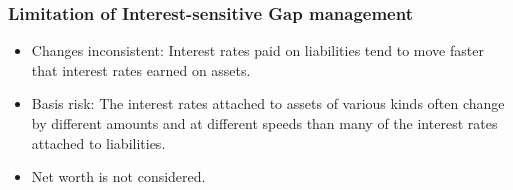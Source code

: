 \subsubsection{Limitation of Interest-sensitive Gap management}
\begin{itemize}
\item Changes inconsistent: Interest rates paid on liabilities tend to move faster that interest rates earned on assets.
\item Basis risk: The interest rates attached to assets of various kinds often change by different amounts and at different speeds than many of the interest rates attached to liabilities.
\item Net worth is not considered.
\end{itemize}



